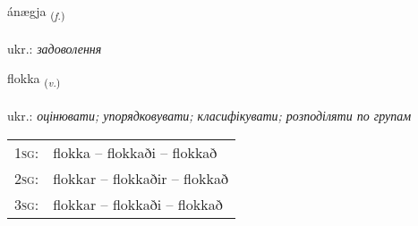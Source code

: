 \documentclass[frontgrid, backgrid]{flacards}\usepackage[]{graphicx}\usepackage[]{xcolor}
\begin{document}
\renewcommand{\flhead}{\vskip5pt \fboxsep=0pt {\small\bfseries\footnotesize Nafnorð | іменник}}
\renewcommand{\fcfoot}{\vskip5pt \fboxsep=0pt \hspace{2pt}{\small\bfseries\footnotesize 2K}}

\renewcommand{\blhead}{\vskip5pt {\small\bfseries\footnotesize Nafnorð | іменник }}
\renewcommand{\bcfoot}{\vskip5pt \hspace{2pt}{\small\bfseries\footnotesize 2K}}


{ánægja \small{\textsubscript{(\textit{f.})}} \\[1ex] %
\textphonetic{[auːnaija]} \\
ukr.: \emph{задоволення} \\  [2ex]
\renewcommand*{\arraystretch}{0.8}
}

\renewcommand{\flhead}{\vskip5pt \fboxsep=0pt {\small\bfseries\footnotesize Sagnorð | дієслово}}
\renewcommand{\fcfoot}{\vskip5pt \fboxsep=0pt \hspace{2pt}{\small\bfseries\footnotesize 2K}}

\renewcommand{\blhead}{\vskip5pt {\small\bfseries\footnotesize Sagnorð | дієслово }}
\renewcommand{\bcfoot}{\vskip5pt \hspace{2pt}{\small\bfseries\footnotesize 2K}}


{flokka \small{\textsubscript{(\textit{v.})}} \\[1ex] %
\textphonetic{[flɔhka]} \\
ukr.: \emph{оцінювати; упорядковувати; класифікувати; розподіляти по групам} \\  [2ex]
\renewcommand*{\arraystretch}{0.8}
\begin{tabular}{p{1cm}l}
\textsc{1sg}: & flokka -- flokkaði -- flokkað \\ 
\textsc{2sg}: & flokkar -- flokkaðir -- flokkað \\ 
\textsc{3sg}: & flokkar -- flokkaði -- flokkað \\ 
\end{tabular}
}
\end{document}
